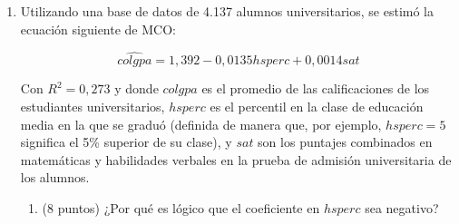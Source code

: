 \documentclass[10pt,a4paper]{article}
\begin{document}
\begin{enumerate}
\begin{enumerate}
\paragraph{4.1 C\'alculos en R.} Usamos \texttt{lm()}:

\begin{lstlisting}
# Datos
X1 <- c(4,3,5,7,6)
X2 <- c(1,2,3,4,4)
Y  <- c(5,7,10,13,12)
datos <- data.frame(X1, X2, Y)

# Modelo simple:
mod_simple <- lm(Y ~ X1, data=datos)
summary(mod_simple)
# (Muestra coeficientes, R^2, etc.)

# Modelo multiple:
mod_multiple <- lm(Y ~ X1 + X2, data=datos)
summary(mod_multiple)
# (Nuevos coeficientes, R^2 mayor, etc.)
\end{lstlisting}

\item ¿De que valor es el sesgo por variable omitida en este ejercicio? ¿Como es la correlación entre $X_1$ y $X_2$
\\
\textbf{Solución}
\\
Vemos que el beta en el modelo simple es de $\tilde{\hat{\beta_1}}=1.90$. Y en el modelo múltiple es $\hat{\beta_1}=0.39$, entonces el sesgo esta dado por:
$$\tilde{\hat{\beta_1}}=\hat{\beta_1}+\hat\beta_2\cdot \delta \implies 1.9 = 0.39 + \hat\beta_2\cdot \delta$$
$$\implies \hat\beta_2\cdot \delta = 1.9-0.39=1.51$$
El sesgo es positivo de valor 1.51, por lo que, como $\beta_2$ es positivo, entonces $\delta$ es positivo, y esto indica que la correlación entre $X_1$ y $X_2$ es positiva.

\end{enumerate}



    \item Utilizando una base de datos de 4.137 alumnos universitarios, se estimó la ecuación siguiente de MCO:

    
$$\hat{colgpa} =1,392 -0,0135 hsperc + 0,0014 sat$$

Con $R^2=0,273$ y donde $colgpa$ es el promedio de las calificaciones de los estudiantes universitarios,
$hsperc$ es el percentil en la clase de educación media en la que se graduó (definida de manera que, por
ejemplo, $hsperc= 5$ significa el 5\% superior de su clase), y $sat$ son los puntajes combinados en
matemáticas y habilidades verbales en la prueba de admisión universitaria de los alumnos.
\begin{enumerate} 
\item (8 puntos) ¿Por qué es lógico que el coeficiente en $hsperc$ sea negativo?


\end{enumerate}
\end{enumerate}
\end{document}
